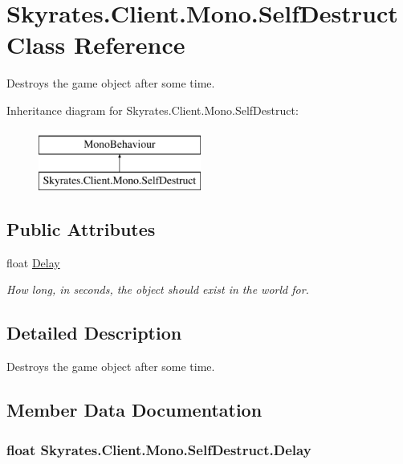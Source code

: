 \hypertarget{class_skyrates_1_1_client_1_1_mono_1_1_self_destruct}{\section{Skyrates.\-Client.\-Mono.\-Self\-Destruct Class Reference}
\label{class_skyrates_1_1_client_1_1_mono_1_1_self_destruct}
}


Destroys the game object after some time.  


Inheritance diagram for Skyrates.\-Client.\-Mono.\-Self\-Destruct\-:\begin{figure}[H]
\begin{center}
\leavevmode
\includegraphics[height=2.000000cm]{class_skyrates_1_1_client_1_1_mono_1_1_self_destruct}
\end{center}
\end{figure}
\subsection*{Public Attributes}
\begin{DoxyCompactItemize}
\item 
float \hyperlink{class_skyrates_1_1_client_1_1_mono_1_1_self_destruct_a8c58f4cbd08df1924e278ce07b71ff63}{Delay}
\begin{DoxyCompactList}\small\item\em How long, in seconds, the object should exist in the world for. \end{DoxyCompactList}\end{DoxyCompactItemize}


\subsection{Detailed Description}
Destroys the game object after some time. 



\subsection{Member Data Documentation}
\hypertarget{class_skyrates_1_1_client_1_1_mono_1_1_self_destruct_a8c58f4cbd08df1924e278ce07b71ff63}{
\subsubsection[{Delay}]{\setlength{\rightskip}{0pt plus 5cm}float Skyrates.\-Client.\-Mono.\-Self\-Destruct.\-Delay}}\label{class_skyrates_1_1_client_1_1_mono_1_1_self_destruct_a8c58f4cbd08df1924e278ce07b71ff63}


